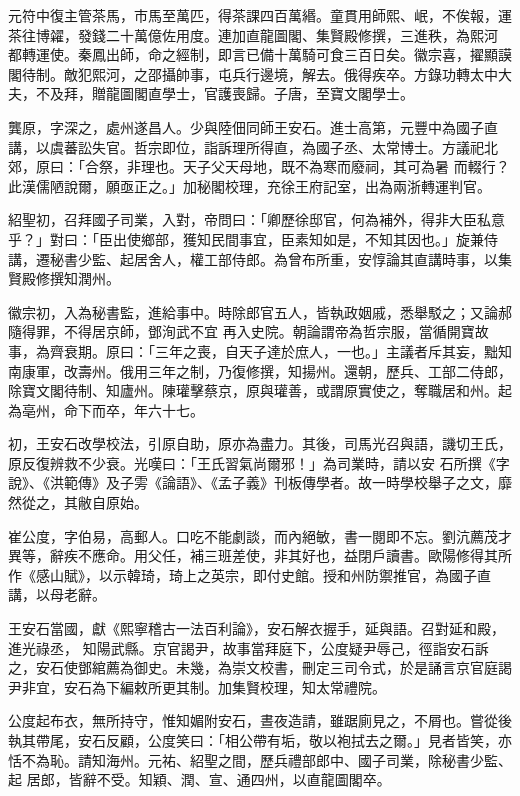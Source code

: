 \begin{pinyinscope}
 元符中復主管茶馬，市馬至萬匹，得茶課四百萬緡。童貫用師熙、岷，不俟報，運茶往博糴，發錢二十萬億佐用度。連加直龍圖閣、集賢殿修撰，三進秩，為熙河
 都轉運使。秦鳳出師，命之經制，即言已備十萬騎可食三百日矣。徽宗喜，擢顯謨閣待制。敵犯熙河，之邵攝帥事，屯兵行邊境，解去。俄得疾卒。方錄功轉太中大夫，不及拜，贈龍圖閣直學士，官護喪歸。子唐，至寶文閣學士。



 龔原，字深之，處州遂昌人。少與陸佃同師王安石。進士高第，元豐中為國子直講，以虞蕃訟失官。哲宗即位，詣訴理所得直，為國子丞、太常博士。方議祀北郊，原曰：「合祭，非理也。天子父天母地，既不為寒而廢祠，其可為暑
 而輟行？此漢儒陋說爾，願亟正之。」加秘閣校理，充徐王府記室，出為兩浙轉運判官。



 紹聖初，召拜國子司業，入對，帝問曰：「卿歷徐邸官，何為補外，得非大臣私意乎？」對曰：「臣出使鄉部，獲知民間事宜，臣素知如是，不知其因也。」旋兼侍講，遷秘書少監、起居舍人，權工部侍郎。為曾布所重，安惇論其直講時事，以集賢殿修撰知潤州。



 徽宗初，入為秘書監，進給事中。時除郎官五人，皆執政姻戚，悉舉駁之；又論郝隨得罪，不得居京師，鄧洵武不宜
 再入史院。朝論謂帝為哲宗服，當循開寶故事，為齊衰期。原曰：「三年之喪，自天子達於庶人，一也。」主議者斥其妄，黜知南康軍，改壽州。俄用三年之制，乃復修撰，知揚州。還朝，歷兵、工部二侍郎，除寶文閣待制、知廬州。陳瓘擊蔡京，原與瓘善，或謂原實使之，奪職居和州。起為亳州，命下而卒，年六十七。



 初，王安石改學校法，引原自助，原亦為盡力。其後，司馬光召與語，譏切王氏，原反復辨救不少衰。光嘆曰：「王氏習氣尚爾邪！」為司業時，請以安
 石所撰《字說》、《洪範傳》及子雱《論語》、《孟子義》刊板傳學者。故一時學校舉子之文，靡然從之，其敝自原始。



 崔公度，字伯易，高郵人。口吃不能劇談，而內絕敏，書一閱即不忘。劉沆薦茂才異等，辭疾不應命。用父任，補三班差使，非其好也，益閉戶讀書。歐陽修得其所作《感山賦》，以示韓琦，琦上之英宗，即付史館。授和州防禦推官，為國子直講，以母老辭。



 王安石當國，獻《熙寧稽古一法百利論》，安石解衣握手，延與語。召對延和殿，進光祿丞，
 知陽武縣。京官謁尹，故事當拜庭下，公度疑尹辱己，徑詣安石訴之，安石使鄧綰薦為御史。未幾，為崇文校書，刪定三司令式，於是誦言京官庭謁尹非宜，安石為下編敕所更其制。加集賢校理，知太常禮院。



 公度起布衣，無所持守，惟知媚附安石，晝夜造請，雖踞廁見之，不屑也。嘗從後執其帶尾，安石反顧，公度笑曰：「相公帶有垢，敬以袍拭去之爾。」見者皆笑，亦恬不為恥。請知海州。元祐、紹聖之間，歷兵禮部郎中、國子司業，除秘書少監、起
 居郎，皆辭不受。知穎、潤、宣、通四州，以直龍圖閣卒。




\end{pinyinscope}

